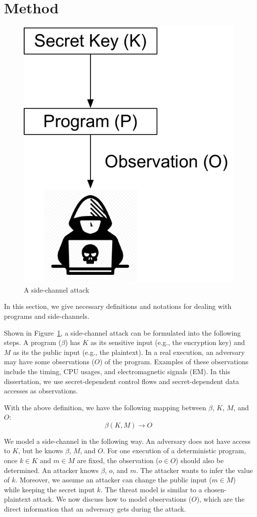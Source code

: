 \section{Method}\label{chapter3:method}
\begin{figure}[ht]
  \centering
  \includegraphics[width=.3\columnwidth]{./figures/chapter3/attack.pdf}
  \caption{A side-channel attack}\label{fig:side-channel-attack}
\end{figure}

In this section, we give necessary definitions and notations for dealing with
programs and side-channels.

Shown in Figure~\ref{fig:side-channel-attack}, a side-channel attack can be formulated into the following steps.  A program ($\beta$) has $K$ as its sensitive input (e.g., the encryption key) and $M$ as its the public input (e.g., the plaintext). In a real execution, an adversary may have
some observations ($O$) of the program. Examples of these observations include the timing, CPU usages, and electromagnetic signals (EM). In this dissertation, we use secret-dependent control flows and secret-dependent data
accesses as observations.

With the above definition, we have the following mapping between $\beta$, $K$, $M$, and $O$:
\begin{displaymath}
  \beta(K, M) \rightarrow O
\end{displaymath}


We model a side-channel in the following way. An adversary does not have
access to $K$, but he knows $\beta$, $M$, and $O$. For one execution of a
deterministic program, once $k \in K$ and $m \in M$ are fixed, the observation
($o \in O$) should also be determined. An attacker knows $\beta$, $o$,
and $m$. The attacker wants to infer the value of $k$. Moreover, we assume
an attacker can change the public input ($m \in M$) while keeping the secret input $k$. The threat model is similar to a chosen-plaintext attack.
We now discuss how to model observations ($O$),
which are the direct information that an adversary gets during the attack.

